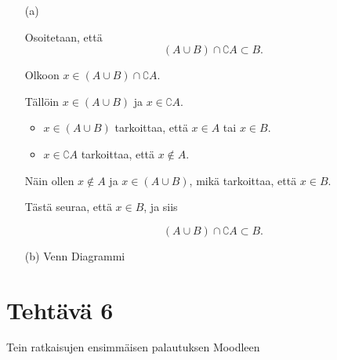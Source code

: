 \documentclass{article}
\begin{document}
\begin{enumerate}
	
\item[(a)]

Osoitetaan, että
\[
(A \cup B) \cap \complement A \subset B.
\]

Olkoon \(x \in (A \cup B) \cap \complement A\).

Tällöin \(x \in (A \cup B)\) ja \(x \in \complement A\).

\begin{itemize}
	\item \(x \in (A \cup B)\) tarkoittaa, että \(x \in A\) tai \(x \in B\).
	\item \(x \in \complement A\) tarkoittaa, että \(x \notin A\).
\end{itemize}

Näin ollen \(x \notin A\) ja \(x \in (A \cup B)\), mikä tarkoittaa, että \(x \in B\).

Tästä seuraa, että \(x \in B\), ja siis

\[
(A \cup B) \cap \complement A \subset B.
\]


\item[(b)]
Venn Diagrammi


\end{enumerate}


\newpage

\section*{Tehtävä 6}

Tein ratkaisujen ensimmäisen palautuksen Moodleen \date{\today}
\end{document}
